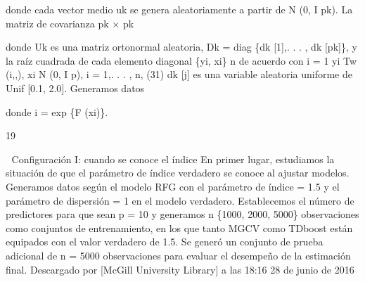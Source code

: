 \documentclass[]{article}
\begin{document}
donde cada vector medio uk se genera aleatoriamente a partir de N (0, I
pk). La matriz de covarianza pk × pk

donde Uk es una matriz ortonormal aleatoria, Dk = diag \{dk {[}1{]},. .
. , dk {[}pk{]}\}, y la raíz cuadrada de cada elemento diagonal \{yi,
xi\} n de acuerdo con i = 1 yi Tw (i,,), xi N (0, I p), i = 1,. . . , n,
(31) dk {[}j{]} es una variable aleatoria uniforme de Unif {[}0.1,
2.0{]}. Generamos datos

donde i = exp \{F (xi)\}.

19

 Configuración I: cuando se conoce el índice En primer lugar,
estudiamos la situación de que el parámetro de índice verdadero se
conoce al ajustar modelos. Generamos datos según el modelo RFG con el
parámetro de índice = 1.5 y el parámetro de dispersión = 1 en el modelo
verdadero. Establecemos el número de predictores para que sean p = 10 y
generamos n \{1000, 2000, 5000\} observaciones como conjuntos de
entrenamiento, en los que tanto MGCV como TDboost están equipados con el
valor verdadero de 1.5. Se generó un conjunto de prueba adicional de n =
5000 observaciones para evaluar el desempeño de la estimación final.
Descargado por {[}McGill University Library{]} a las 18:16 28 de junio
de 2016
\end{document}
